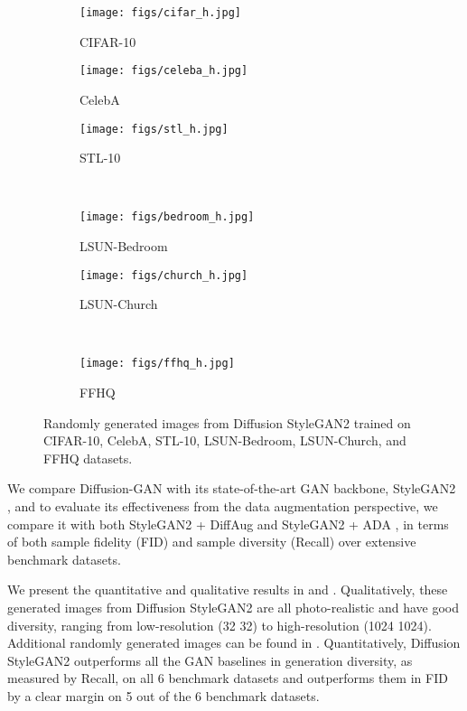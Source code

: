 \documentclass{article} \usepackage{iclr2023_conference,times}
\theoremstyle{plain}
\theoremstyle{definition}
\theoremstyle{remark}
\begin{document}
\begin{figure}[!t]
    \centering
    \begin{subfigure}[b]{0.16\textwidth}
        \texttt{[image: figs/cifar\_h.jpg]}
        \caption{\small CIFAR-10}
    \end{subfigure}
    \begin{subfigure}[b]{0.40\textwidth}
        \texttt{[image: figs/celeba\_h.jpg]}
        \caption{\small CelebA}
    \end{subfigure}
    \begin{subfigure}[b]{0.40\textwidth}
        \texttt{[image: figs/stl\_h.jpg]}
        \caption{\small STL-10}
    \end{subfigure} \\
    \begin{subfigure}[b]{0.482\textwidth}
       \texttt{[image: figs/bedroom\_h.jpg]}
        \caption{\small LSUN-Bedroom}
    \end{subfigure}
    \begin{subfigure}[b]{0.482\textwidth}
       \texttt{[image: figs/church\_h.jpg]}
        \caption{\small LSUN-Church}
    \end{subfigure} \\
    \begin{subfigure}[b]{0.97\textwidth}
       \texttt{[image: figs/ffhq\_h.jpg]}
        \caption{\small FFHQ}
    \end{subfigure}
     \vspace{-1mm}
    \caption{\small Randomly generated images from Diffusion StyleGAN2 trained on CIFAR-10, CelebA, STL-10, LSUN-Bedroom, LSUN-Church, and FFHQ datasets. }
    \vspace{-2mm}
    \label{fig:show_image}
\end{figure}


We compare Diffusion-GAN with its state-of-the-art GAN backbone, StyleGAN2 \citep{karras2020training}, and to evaluate its effectiveness from the data augmentation perspective, we compare it with both StyleGAN2 + DiffAug \citep{zhao2020differentiable} and StyleGAN2 + ADA \citep{karras2020training}, in terms of both sample fidelity (FID) and sample diversity (Recall) over extensive benchmark datasets. 

We present the quantitative and qualitative results in  and . Qualitatively, these generated images from Diffusion StyleGAN2 are all photo-realistic and have good diversity, ranging from low-resolution (32 
32) to high-resolution (1024  1024). Additional randomly generated images  can be found in . Quantitatively, Diffusion StyleGAN2 outperforms all the GAN baselines in generation diversity, as measured by Recall, on all 6 benchmark datasets and outperforms them in FID by a clear margin on 5 out of the 6 benchmark datasets. 
\end{document}
